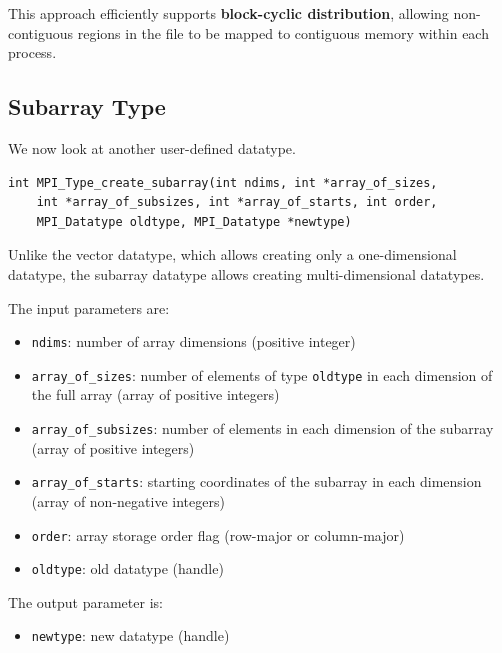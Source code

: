 \documentclass[12pt]{book}
\begin{document}
This approach efficiently supports \textbf{block-cyclic distribution}, allowing non-contiguous regions in the file to be mapped to contiguous memory within each process.

\subsection{Subarray Type}
\label{subsec:subarray_type}

We now look at another user-defined datatype.

\begin{lstlisting}[style=cppstyle]
int MPI_Type_create_subarray(int ndims, int *array_of_sizes,
    int *array_of_subsizes, int *array_of_starts, int order,
    MPI_Datatype oldtype, MPI_Datatype *newtype)
\end{lstlisting}

Unlike the vector datatype, which allows creating only a one-dimensional datatype, the subarray datatype allows creating multi-dimensional datatypes.

The input parameters are:
\begin{itemize}
    \item \texttt{ndims}: number of array dimensions (positive integer)
    \item \texttt{array\_of\_sizes}: number of elements of type \texttt{oldtype} in each dimension of the full array (array of positive integers)
    \item \texttt{array\_of\_subsizes}: number of elements in each dimension of the subarray (array of positive integers)
    \item \texttt{array\_of\_starts}: starting coordinates of the subarray in each dimension (array of non-negative integers)
    \item \texttt{order}: array storage order flag (row-major or column-major)
    \item \texttt{oldtype}: old datatype (handle)
\end{itemize}

The output parameter is:
\begin{itemize}
    \item \texttt{newtype}: new datatype (handle)
\end{itemize}
\end{document}
